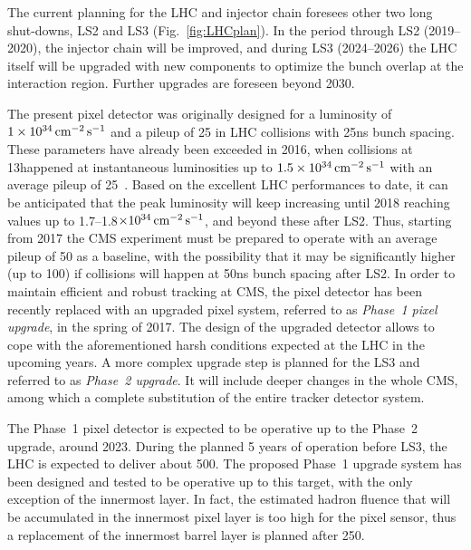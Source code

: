 The current planning for the LHC and injector chain foresees other two long shut-downs, LS2 and LS3 (Fig.~\ref{fig:LHCplan}).
In the period through LS2 (2019--2020), the injector chain will be improved,
and during LS3 (2024--2026) the LHC itself will be upgraded with new components to optimize the bunch overlap at the interaction region. 
Further upgrades are foreseen beyond 2030.

The present pixel detector was originally designed for a luminosity of $1\times10^{34}\,\text{cm}^\text{$-$2}\,\text{s}^\text{$-$1}$ and a pileup of 25 in LHC collisions with 25\unit{ns} bunch spacing.
These parameters have already been exceeded in 2016, when collisions at 13\TeV happened at instantaneous luminosities up to $1.5\times10^{34}\,\text{cm}^\text{$-$2}\,\text{s}^\text{$-$1}$ with an average pileup of 25~\cite{LumiPublicResults}.
Based on the excellent LHC performances to date, it can be anticipated that the peak luminosity will keep increasing until 2018 reaching values up to 1.7--1.8$\times10^{34}\,\text{cm}^\text{$-$2}\,\text{s}^\text{$-$1}$, and beyond these after LS2.
Thus, starting from 2017 the CMS experiment must be prepared to operate with an average pileup of 50 as a baseline,
with the possibility that it may be significantly higher (up to 100) if collisions will happen at 50\unit{ns} bunch spacing after LS2.
In order to maintain efficient and robust tracking at CMS, the pixel detector has been recently replaced with an upgraded pixel system, referred to as {\it Phase~1 pixel upgrade}, in the spring of 2017.
The design of the upgraded detector allows to cope with the aforementioned harsh conditions expected at the LHC in the upcoming years.
A more complex upgrade step is planned for the LS3 and referred to as {\it Phase~2 upgrade}. It will include deeper changes in the whole CMS, among which a complete substitution of the entire tracker detector system.

The Phase~1 pixel detector is expected to be operative up to the Phase~2 upgrade, around 2023.
During the planned 5 years of operation before LS3, the LHC is expected to deliver about 500\fbinv.
The proposed Phase~1 upgrade system has been designed and tested to be operative up to this target, with the only exception of the innermost layer.
In fact, the estimated hadron fluence that will be accumulated in the innermost pixel layer is too high for the pixel sensor, thus a replacement of the innermost barrel layer is planned after 250\fbinv.

